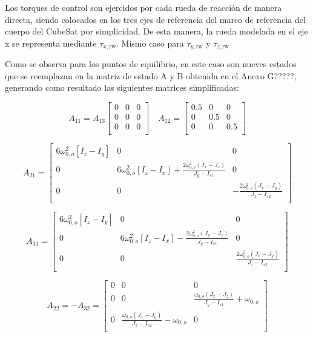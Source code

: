 Los torques de control son ejercidos por cada rueda de reacción de manera directa, siendo colocados en los tres ejes de referencia del marco de referencia del cuerpo del CubeSat por simplicidad. De esta manera, la rueda modelada en el eje x se representa mediante $\tau_{x, \text{rw}}$. Mismo caso para $\tau_{y, \text{rw}}$ y $\tau_{z, \text{rw}}$

Como se observa para los puntos de equilibrio, en este caso son nueves estados que se reemplazan en la matriz de estado A y B obtenida en el Anexo G?????, generando como resultado las siguientes matrices simplificadas:

\[
A_{11} = A_{13}
\begin{bmatrix}
	0 & 0 & 0 \\
	0 & 0 & 0 \\
	0 & 0 & 0 \\
\end{bmatrix} \quad
A_{12} = 
\begin{bmatrix}
	0.5 & 0 & 0 \\
	0 & 0.5 & 0 \\
	0 & 0 & 0.5 \\
\end{bmatrix}
\]

\[
A_{21} = 
\begin{bmatrix}
	 6 \omega_{0,o}^2 \left[I_z - I_y\right]  & 0 & 0 \\
	0 & 6 \omega_{0,o}^2 \left[I_z - I_x\right] + \frac{2 \omega_{0,o}^2 \left(J_x - J_z\right)}{J_y - I_{s1}}
	 & 0 \\
	0 & 0 &  -\frac{2 \omega_{0,o}^2 \left(J_x - J_y\right)}{J_z - I_{s2}}
	 \\
\end{bmatrix}
\]

\[
A_{31} = 
\begin{bmatrix}
	6 \omega_{0,o}^2 \left[I_z - I_y\right]  & 0 & 0 \\
	0 & 6 \omega_{0,o}^2 \left[I_z - I_x\right] - \frac{2 \omega_{0,o}^2 \left(J_x - J_z\right)}{J_y - I_{s1}}
	& 0 \\
	0 & 0 &  \frac{2 \omega_{0,o}^2 \left(J_x - J_y\right)}{J_z - I_{s2}}
	\\
\end{bmatrix}
\]

\[
A_{22} = -A_{32} = 
\begin{bmatrix}
	0  & 0 & 0 \\
	0  & 0 & \frac{\omega_{0,o} \left(J_x - J_z\right)}{J_y - I_{s1}} + \omega_{0,o} \\
	0 & \frac{\omega_{0,o} \left(J_x - J_y\right)}{J_z - I_{s2}} - \omega_{0,o} & 0	\\
\end{bmatrix}
\]

